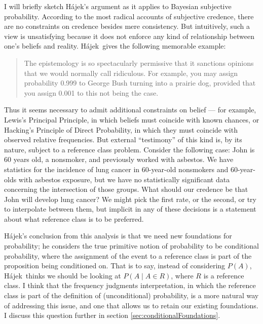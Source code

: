\documentclass[letterpaper,12pt]{article}
\newcommand{\hajek}{H\'ajek}
\begin{document}
I will briefly sketch \hajek's argument as it applies to Bayesian subjective probability. According to the most radical accounts of subjective credence, there are no constraints on credence besides mere consistency. But intuitively, such a view is unsatisfying because it does not enforce any kind of relationship between one's beliefs and reality. \hajek\ gives the following memorable example:
\begin{quote}
The epistemology is so spectacularly permissive that it sanctions opinions that we would normally call ridiculous. For example, you may assign probability 0.999 to George Bush turning into a prairie dog, provided that you assign 0.001 to this not being the case.
\end{quote}

Thus it seems necessary to admit additional constraints on belief --- for example, Lewis's Principal Principle, in which beliefs must coincide with known chances, or Hacking's Principle of Direct Probability, in which they must coincide with observed relative frequencies. But external ``testimony'' of this kind is, by its nature, subject to a reference class problem. Consider the following case: John is 60 years old, a nonsmoker, and previously worked with asbestos. We have statistics for the incidence of lung cancer in 60-year-old nonsmokers and 60-year-olds with asbestos exposure, but we have no statistically significant data concerning the intersection of those groups. What should our credence be that John will develop lung cancer? We might pick the first rate, or the second, or try to interpolate between them, but implicit in any of these decisions is a statement about what reference class is to be preferred.

\hajek's conclusion from this analysis is that we need new foundations for probability; he considers the true primitive notion of probability to be conditional probability, where the assignment of the event to a reference class is part of the proposition being conditioned on. That is to say, instead of considering $P(A)$, \hajek\ thinks we should be looking at $P(A \mid A \in R)$, where $R$ is a reference class. I think that the frequency judgments interpretation, in which the reference class is part of the definition of (unconditional) probability, is a more natural way of addressing this issue, and one that allows us to retain our existing foundations. I discuss this question further in section \ref{sec:conditionalFoundations}.
\end{document}
